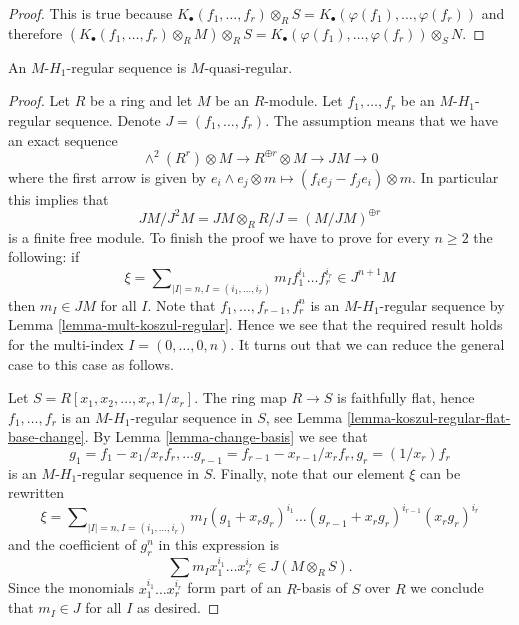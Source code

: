 \begin{proof}
This is true because
$K_\bullet(f_1, \ldots, f_r) \otimes_R S =
K_\bullet(\varphi(f_1), \ldots, \varphi(f_r))$
and therefore
$(K_\bullet(f_1, \ldots, f_r) \otimes_R M) \otimes_R S =
K_\bullet(\varphi(f_1), \ldots, \varphi(f_r)) \otimes_S N$.
\end{proof}

\begin{lemma}
\label{lemma-H1-regular-quasi-regular}
An $M$-$H_1$-regular sequence is $M$-quasi-regular.
\end{lemma}

\begin{proof}
Let $R$ be a ring and let $M$ be an $R$-module.
Let $f_1, \ldots, f_r$ be an $M$-$H_1$-regular sequence.
Denote $J = (f_1, \ldots, f_r)$. The assumption means that we have
an exact sequence
$$
\wedge^2(R^r) \otimes M \to R^{\oplus r} \otimes M \to JM \to 0
$$
where the first arrow is given by
$e_i \wedge e_j \otimes m \mapsto (f_ie_j - f_je_i) \otimes m$.
In particular this implies that
$$
JM/J^2M = JM \otimes_R R/J = (M/JM)^{\oplus r}
$$
is a finite free module. To finish the proof we have to prove
for every $n \geq 2$ the following: if
$$
\xi = \sum\nolimits_{|I| = n, I = (i_1, \ldots, i_r)}
m_I f_1^{i_1} \ldots f_r^{i_r} \in J^{n + 1}M
$$
then $m_I \in JM$ for all $I$. Note that $f_1, \ldots, f_{r - 1}, f_r^n$
is an $M$-$H_1$-regular sequence by
Lemma \ref{lemma-mult-koszul-regular}.
Hence we see that the required result holds for
the multi-index $I = (0, \ldots, 0, n)$. It turns out that we can
reduce the general case to this case as follows.

\medskip\noindent
Let $S = R[x_1, x_2, \ldots, x_r, 1/x_r]$. The ring map $R \to S$ is faithfully
flat, hence $f_1, \ldots, f_r$ is an $M$-$H_1$-regular sequence in $S$, see
Lemma \ref{lemma-koszul-regular-flat-base-change}.
By
Lemma \ref{lemma-change-basis}
we see that
$$
g_1 = f_1 - x_1/x_r f_r, \ldots
g_{r - 1} = f_{r - 1} - x_{r - 1}/x_r f_r,
g_r = (1/x_r)f_r
$$
is an $M$-$H_1$-regular sequence in $S$. Finally, note that our element
$\xi$ can be rewritten
$$
\xi = \sum\nolimits_{|I| = n, I = (i_1, \ldots, i_r)}
m_I (g_1 + x_r g_r)^{i_1} \ldots (g_{r - 1} + x_r g_r)^{i_{r - 1}}
(x_rg_r)^{i_r}
$$
and the coefficient of $g_r^n$ in this expression is
$$
\sum m_I x_1^{i_1} \ldots x_r^{i_r} \in J(M \otimes_R S).
$$
Since the monomials $x_1^{i_1} \ldots x_r^{i_r}$ form part of an $R$-basis
of $S$ over $R$ we conclude that $m_I \in J$ for all $I$ as desired.
\end{proof}

